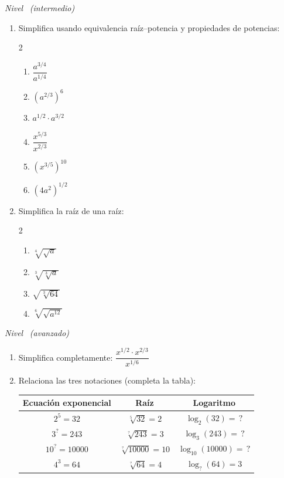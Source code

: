 \documentclass[11pt, letterpaper]{article}
\begin{document}
\textit{Nivel} \bigstar\bigstar\ \textit{(intermedio)}

\begin{enumerate}[label=\textbf{\arabic*.}, leftmargin=*, resume]
  \item Simplifica usando equivalencia raíz–potencia y propiedades de potencias:
  \begin{multicols}{2}
  \begin{enumerate}[label=\alph*)]
    \item $\dfrac{a^{3/4}}{a^{1/4}}$
    \item $\left(a^{2/3}\right)^6$
    \item $a^{1/2} \cdot a^{3/2}$
    \item $\dfrac{x^{5/3}}{x^{2/3}}$
    \item $\left(x^{3/5}\right)^{10}$
    \item $(4a^2)^{1/2}$
  \end{enumerate}
  \end{multicols}

  \item Simplifica la raíz de una raíz:
  \begin{multicols}{2}
  \begin{enumerate}[label=\alph*)]
    \item $\sqrt[4]{\sqrt{a}}$
    \item $\sqrt[3]{\sqrt[3]{a}}$
    \item $\sqrt{\sqrt[3]{64}}$
    \item $\sqrt[6]{\sqrt{a^{12}}}$
  \end{enumerate}
  \end{multicols}
\end{enumerate}

\textit{Nivel} \bigstar\bigstar\bigstar\ \textit{(avanzado)}

\begin{enumerate}[label=\textbf{\arabic*.}, leftmargin=*, resume]
  \item Simplifica completamente: $\dfrac{x^{1/2} \cdot x^{2/3}}{x^{1/6}}$

  \item Relaciona las tres notaciones (completa la tabla):
  \begin{center}
  \renewcommand{\arraystretch}{1.5}
  \begin{tabular}{|c|c|c|}
  \hline
  \textbf{Ecuación exponencial} & \textbf{Raíz} & \textbf{Logaritmo}\\
  \hline
  $2^5 = 32$ & $\sqrt[5]{32}=2$ & $\log_2(32)=\,?$\\
  \hline
  $3^? = 243$ & $\sqrt[?]{243}=3$ & $\log_3(243)=\,?$\\
  \hline
  $10^? = 10000$ & $\sqrt[?]{10000}=10$ & $\log_{10}(10000)=\,?$\\
  \hline
  $4^3 = 64$ & $\sqrt[?]{64}=4$ & $\log_?(64)=3$\\
  \hline
  \end{tabular}
  \end{center}
\end{enumerate}
\end{document}
